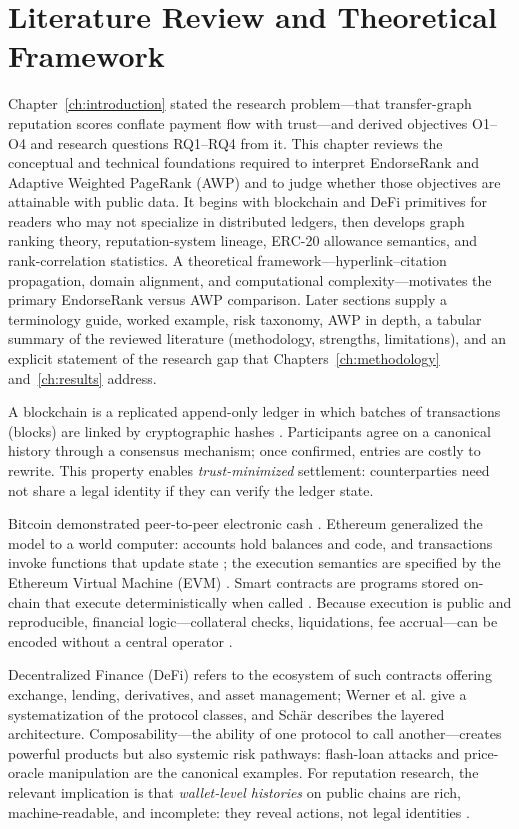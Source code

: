 \chapter{Literature Review and Theoretical Framework}
\label{ch:literature}

Chapter~\ref{ch:introduction} stated the research problem---that transfer-graph reputation scores conflate payment flow with trust---and derived objectives O1--O4 and research questions RQ1--RQ4 from it. This chapter reviews the conceptual and technical foundations required to interpret EndorseRank and Adaptive Weighted PageRank (AWP) and to judge whether those objectives are attainable with public data. It begins with blockchain and DeFi primitives for readers who may not specialize in distributed ledgers, then develops graph ranking theory, reputation-system lineage, ERC-20 allowance semantics, and rank-correlation statistics. A theoretical framework---hyperlink--citation propagation, domain alignment, and computational complexity---motivates the primary EndorseRank versus AWP comparison. Later sections supply a terminology guide, worked example, risk taxonomy, AWP in depth, a tabular summary of the reviewed literature (methodology, strengths, limitations), and an explicit statement of the research gap that Chapters~\ref{ch:methodology} and~\ref{ch:results} address.


A blockchain is a replicated append-only ledger in which batches of transactions (blocks) are linked by cryptographic hashes . Participants agree on a canonical history through a consensus mechanism; once confirmed, entries are costly to rewrite. This property enables \emph{trust-minimized} settlement: counterparties need not share a legal identity if they can verify the ledger state.

Bitcoin demonstrated peer-to-peer electronic cash . Ethereum generalized the model to a world computer: accounts hold balances and code, and transactions invoke functions that update state ; the execution semantics are specified by the Ethereum Virtual Machine (EVM) . Smart contracts are programs stored on-chain that execute deterministically when called . Because execution is public and reproducible, financial logic---collateral checks, liquidations, fee accrual---can be encoded without a central operator .

Decentralized Finance (DeFi) refers to the ecosystem of such contracts offering exchange, lending, derivatives, and asset management; Werner et al. give a systematization of the protocol classes, and Sch\"{a}r describes the layered architecture. Composability---the ability of one protocol to call another---creates powerful products  but also systemic risk pathways: flash-loan attacks  and price-oracle manipulation  are the canonical examples. For reputation research, the relevant implication is that \emph{wallet-level histories} on public chains are rich, machine-readable, and incomplete: they reveal actions, not legal identities .

